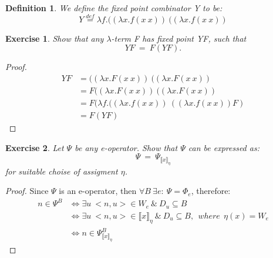 \documentclass{article}
\newtheorem{definition}{Definition}[section] %
\newtheorem{exercise}{Exercise}[section]
\begin{document}
	\begin{definition}
		We define the fixed point combinator Y to be:
		\begin{equation}
			Y \stackrel{def}{=} \lambda f.
				((\lambda x. f(x\:x))\:
				((\lambda x. f(x\:x))
		\end{equation}
	\end{definition}
	\begin{exercise}
		Show that any $\lambda$-term F has fixed point YF, such that
			\begin{equation}
				YF\:=\:F(YF).
			\end{equation}
	\end{exercise}
	\begin{proof}
		\begin{equation*}
     \begin{split}
			YF &= ((\lambda x. F(x\:x))\:((\lambda x. F(x\:x))\\
				&= F((\lambda x. F(x\:x))\:((\lambda x. F(x\:x))\\
				&= F(\lambda f. 
						((\lambda x. f(x\:x))\:
						((\lambda x. f(x\:x)) F)\\
				&= F(YF)
     \end{split}
		\end{equation*}
	\end{proof}

	\begin{exercise}
		Let $\Psi$ be any e-operator. Show that $\Psi$ can be
		expressed as:
			\begin{equation}
				\Psi\:=\:\Psi_{\llbracket x \rrbracket_{\eta}}
			\end{equation}
		for suitable choise of assigment $\eta$.
	\end{exercise}
	\begin{proof}
		Since $\Psi$ is an e-operator, then 
		$\forall B \: \exists e:\: \Psi = \Phi_e$, therefore:
		\begin{equation*}
		\begin{split}
			n \in \Psi^B &\iff \exists u \: 
				<n, u> \in W_e \:\&\: D_u \subseteq B\\
			&\iff \exists u \: <n, u> \in 
				\llbracket x \rrbracket_{\eta} \:\&\: D_u \subseteq B
				,\:\: where \:\:\eta(x) = W_e\\
			&\iff n \in \Psi_{\llbracket x \rrbracket_{\eta}}^B
		\end{split}
		\end{equation*}
	\end{proof}
\end{document}
